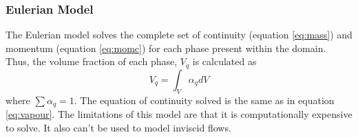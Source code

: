 \documentclass[11pt,a4paper,twoside,oneside]{article}
\begin{document}

\subsubsection{Eulerian Model}\label{sec:euler}
The Eulerian model solves the complete set of continuity (equation \ref{eq:mass}) and momentum (equation \ref{eq:momc}) for each phase present within the domain. Thus, the volume fraction of each phase, $V_q$ is calculated as $$V_{q}=\int_{V} \alpha_{q} d V$$ where $\sum \alpha_q=1$. The equation of continuity solved is the same as in equation \ref{eq:vapour}. The limitations of this model are that it is computationally expensive to solve. It also can't be used to model inviscid flows\cite{stdeulermodel}.
\end{document}
